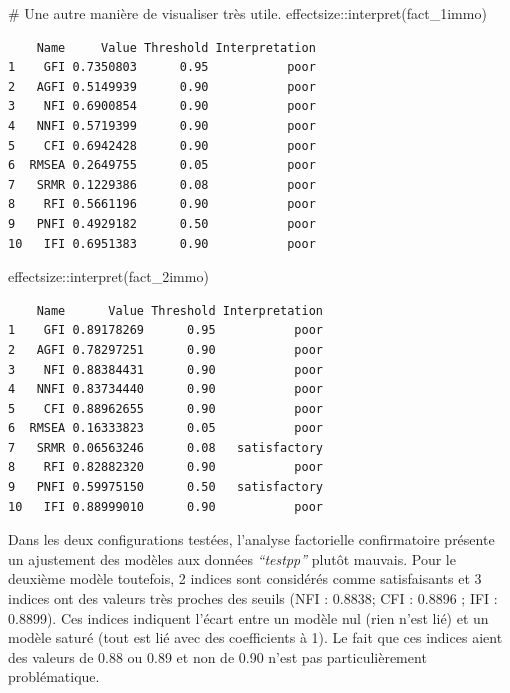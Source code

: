 \documentclass[
  french,
  11pt,
  a4paper,
]{article}
\newenvironment{Shaded}{}{}
\newcommand{\CommentTok}[1]{\textcolor[rgb]{0.42,0.45,0.49}{#1}}
\newcommand{\FunctionTok}[1]{\textcolor[rgb]{0.44,0.26,0.76}{#1}}
\newcommand{\NormalTok}[1]{\textcolor[rgb]{0.14,0.16,0.18}{#1}}
\newcommand{\SpecialCharTok}[1]{\textcolor[rgb]{0.00,0.36,0.77}{#1}}
\begin{document}
\begin{Shaded}
\begin{Highlighting}[]
\CommentTok{\# Une autre manière de visualiser très utile.}
\NormalTok{effectsize}\SpecialCharTok{::}\FunctionTok{interpret}\NormalTok{(fact\_1immo)}
\end{Highlighting}
\end{Shaded}

\begin{verbatim}
    Name     Value Threshold Interpretation
1    GFI 0.7350803      0.95           poor
2   AGFI 0.5149939      0.90           poor
3    NFI 0.6900854      0.90           poor
4   NNFI 0.5719399      0.90           poor
5    CFI 0.6942428      0.90           poor
6  RMSEA 0.2649755      0.05           poor
7   SRMR 0.1229386      0.08           poor
8    RFI 0.5661196      0.90           poor
9   PNFI 0.4929182      0.50           poor
10   IFI 0.6951383      0.90           poor
\end{verbatim}

\begin{Shaded}
\begin{Highlighting}[]
\NormalTok{effectsize}\SpecialCharTok{::}\FunctionTok{interpret}\NormalTok{(fact\_2immo)}
\end{Highlighting}
\end{Shaded}

\begin{verbatim}
    Name      Value Threshold Interpretation
1    GFI 0.89178269      0.95           poor
2   AGFI 0.78297251      0.90           poor
3    NFI 0.88384431      0.90           poor
4   NNFI 0.83734440      0.90           poor
5    CFI 0.88962655      0.90           poor
6  RMSEA 0.16333823      0.05           poor
7   SRMR 0.06563246      0.08   satisfactory
8    RFI 0.82882320      0.90           poor
9   PNFI 0.59975150      0.50   satisfactory
10   IFI 0.88999010      0.90           poor
\end{verbatim}

Dans les deux configurations testées, l'analyse factorielle
confirmatoire présente un ajustement des modèles aux données
\emph{``testpp''} plutôt mauvais. Pour le deuxième modèle toutefois, 2
indices sont considérés comme satisfaisants et 3 indices ont des valeurs
très proches des seuils (NFI : 0.8838; CFI : 0.8896 ; IFI : 0.8899). Ces
indices indiquent l'écart entre un modèle nul (rien n'est lié) et un
modèle saturé (tout est lié avec des coefficients à 1). Le fait que ces
indices aient des valeurs de 0.88 ou 0.89 et non de 0.90 n'est pas
particulièrement problématique.
\end{document}
